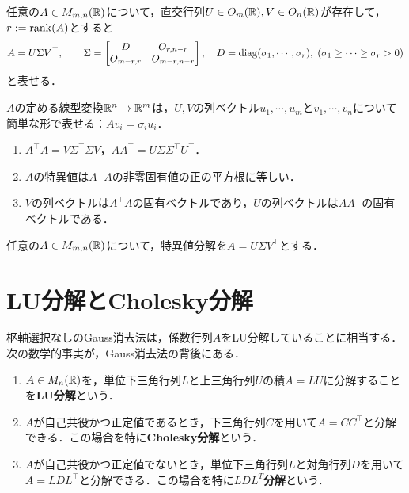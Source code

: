 \documentclass[uplatex, dvipdfmx]{jsreport}
\begin{document}
\begin{theorem}
    任意の$A\in M_{m,n}(\mathbb{R})$について，直交行列$U\in O_m(\mathbb{R}),V\in O_n(\mathbb{R})$が存在して，$r:=\mathrm{rank}(A)$とすると
    \[A=U\Sigma V^\top,\qquad\Sigma=\begin{bmatrix}D&O_{r,n-r}\\O_{m-r,r}&O_{m-r,n-r}\end{bmatrix},\quad D=\mathrm{diag}(\sigma_1,\cdots,\sigma_r),\;(\sigma_1\ge\cdots\ge\sigma_r>0)\]
    と表せる．
\end{theorem}
\begin{remarks}
    $A$の定める線型変換$\mathbb{R}^n\to\mathbb{R}^m$は，$U,V$の列ベクトル$u_1,\cdots,u_m$と$v_1,\cdots,v_n$について簡単な形で表せる：$Av_i=\sigma_iu_i$．
\end{remarks}

\begin{corollary}\mbox{}
    \begin{enumerate}
        \item $A^\top A=V\Sigma^\top\Sigma V$，$AA^\top=U\Sigma\Sigma^\top U^\top$．
        \item $A$の特異値は$A^\top A$の非零固有値の正の平方根に等しい．
        \item $V$の列ベクトルは$A^\top A$の固有ベクトルであり，$U$の列ベクトルは$AA^\top$の固有ベクトルである．
    \end{enumerate}
\end{corollary}

\begin{theorem}[一般化逆行列の公式]
    任意の$A\in M_{m,n}(\mathbb{R})$について，特異値分解を$A=U\Sigma V^\top$とする．
\end{theorem}

\section{LU分解とCholesky分解}

\begin{tcolorbox}[colframe=ForestGreen, colback=ForestGreen!10!white,breakable,colbacktitle=ForestGreen!40!white,coltitle=black,fonttitle=\bfseries\sffamily,
title=]
    枢軸選択なしのGauss消去法は，係数行列$A$をLU分解していることに相当する．
    次の数学的事実が，Gauss消去法の背後にある．
\end{tcolorbox}

\begin{definition}\mbox{}
    \begin{enumerate}
        \item $A\in M_n(\mathbb{R})$を，単位下三角行列$L$と上三角行列$U$の積$A=LU$に分解することを\textbf{LU分解}という．
        \item $A$が自己共役かつ正定値であるとき，下三角行列$C$を用いて$A=CC^\top$と分解できる．この場合を特に\textbf{Cholesky分解}という．
        \item $A$が自己共役かつ正定値でないとき，単位下三角行列$L$と対角行列$D$を用いて$A=LDL^\top$と分解できる．この場合を特に\textbf{$LDL^T$分解}という．
    \end{enumerate}
\end{definition}
\end{document}
